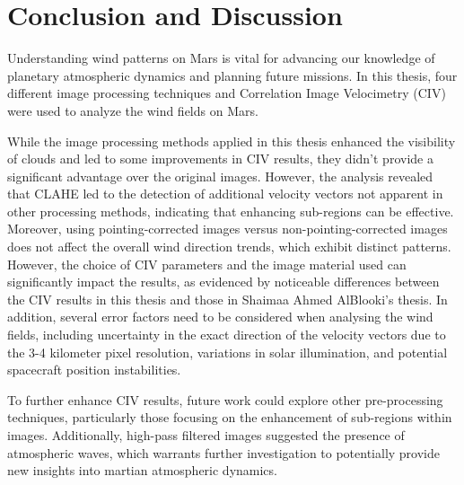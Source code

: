 \chapter{Conclusion and Discussion\label{chap:conclusion}}

Understanding wind patterns on Mars is vital for advancing our knowledge of planetary atmospheric dynamics and planning future missions. In this thesis, four different image processing techniques and Correlation Image Velocimetry (CIV) were used to analyze the wind fields on Mars.

While the image processing methods applied in this thesis enhanced the visibility of clouds and led to some improvements in CIV results, they didn't provide a significant advantage over the original images.
However, the analysis revealed that CLAHE led to the detection of additional velocity vectors not apparent in other processing methods, indicating that enhancing sub-regions can be effective. 
Moreover, using pointing-corrected images versus non-pointing-corrected images does not affect the overall wind direction trends, which exhibit distinct patterns. However, the choice of CIV parameters and the image material used can significantly impact the results, as evidenced by noticeable differences between the CIV results in this thesis and those in Shaimaa Ahmed AlBlooki's thesis. In addition, several error factors need to be considered when analysing the wind fields, including uncertainty in the exact direction of the velocity vectors due to the 3-4 kilometer pixel resolution, variations in solar illumination, and potential spacecraft position instabilities.

To further enhance CIV results, future work could explore other pre-processing techniques, particularly those focusing on the enhancement of sub-regions within images. Additionally, high-pass filtered images suggested the presence of atmospheric waves, which warrants further investigation to potentially provide new insights into martian atmospheric dynamics.

